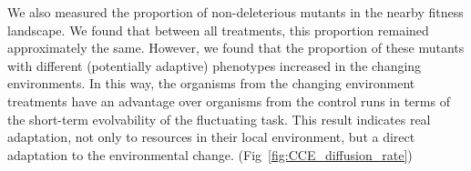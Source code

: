 \documentclass[PhD]{msu-thesis}
\begin{document}
We also measured the proportion of non-deleterious mutants in the nearby fitness landscape. We found that between all treatments, this proportion
remained approximately the same. However, we found that the proportion of these mutants with different (potentially adaptive) phenotypes increased in the changing environments. In this way, the organisms from the changing environment treatments have an advantage over organisms from the control runs in terms of the short-term evolvability of the fluctuating task. This result indicates real adaptation, not only to resources in their local environment, but a direct adaptation to the environmental change. (Fig~\ref{fig:CCE_diffusion_rate})

\end{document}
